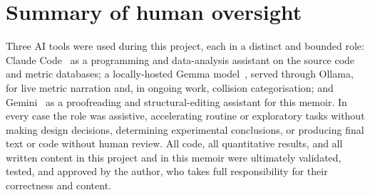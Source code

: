 \section{Summary of human oversight}\label{app:ai-summary}

Three AI tools were used during this project, each in a distinct and bounded role:
Claude Code~\cite{anthropic2025claudecode} as a programming and data-analysis assistant
on the source code and metric databases; a locally-hosted Gemma
model~\cite{team2024gemma}, served through Ollama, for live metric narration and, in
ongoing work, collision categorisation; and Gemini~\cite{geminiteam2025gemini} as a
proofreading and structural-editing assistant for this memoir. In every case the role
was assistive, accelerating routine or exploratory tasks without making design
decisions, determining experimental conclusions, or producing final text or code without
human review. All code, all quantitative results, and all written content in
this project and in this memoir were ultimately validated, tested, and approved by the
author, who takes full responsibility for their correctness and content.
